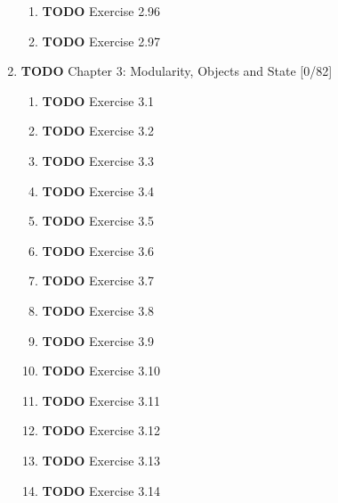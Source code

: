 \documentclass[11pt]{article}
\begin{document}
\begin{enumerate}
\begin{enumerate}
\item {\bfseries\sffamily TODO} Exercise 2.96
\label{sec:org61f472e}

\item {\bfseries\sffamily TODO} Exercise 2.97
\label{sec:orgcbf4b17}
\end{enumerate}


\item {\bfseries\sffamily TODO} Chapter 3: Modularity, Objects and State [0/82]
\label{sec:org794160b}


\begin{enumerate}
\item {\bfseries\sffamily TODO} Exercise 3.1
\label{sec:orgd80b96d}

\item {\bfseries\sffamily TODO} Exercise 3.2
\label{sec:org33954c5}

\item {\bfseries\sffamily TODO} Exercise 3.3
\label{sec:org697aa9c}

\item {\bfseries\sffamily TODO} Exercise 3.4
\label{sec:org68ac75b}

\item {\bfseries\sffamily TODO} Exercise 3.5
\label{sec:orgddabb86}

\item {\bfseries\sffamily TODO} Exercise 3.6
\label{sec:org0bb38a4}

\item {\bfseries\sffamily TODO} Exercise 3.7
\label{sec:orgfdfae95}

\item {\bfseries\sffamily TODO} Exercise 3.8
\label{sec:org50e1626}

\item {\bfseries\sffamily TODO} Exercise 3.9
\label{sec:org1e78a3f}

\item {\bfseries\sffamily TODO} Exercise 3.10
\label{sec:org966200f}

\item {\bfseries\sffamily TODO} Exercise 3.11
\label{sec:orgec207b5}

\item {\bfseries\sffamily TODO} Exercise 3.12
\label{sec:orgc3ecc66}

\item {\bfseries\sffamily TODO} Exercise 3.13
\label{sec:org21dc783}

\item {\bfseries\sffamily TODO} Exercise 3.14
\label{sec:org0301f32}


\end{enumerate}
\end{enumerate}
\end{document}
